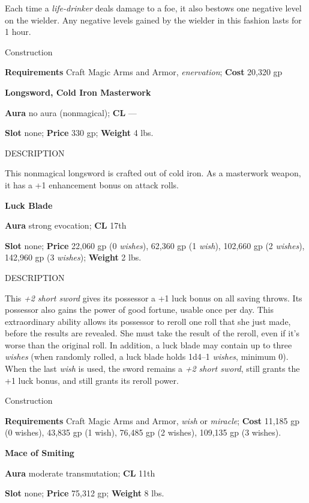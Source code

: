 Each time a \textit{life-drinker} deals damage to a foe, it also bestows one negative level on the wielder. Any negative levels gained by the wielder in this fashion lasts for 1 hour. 
				
Construction
				
\textbf{Requirements} Craft Magic Arms and Armor, \textit{enervation}; \textbf{Cost }20,320 gp
				
\textbf{Longsword, Cold Iron Masterwork }
				
\textbf{Aura} no aura (nonmagical); \textbf{CL} ---
				
\textbf{Slot} none; \textbf{Price} 330 gp; \textbf{Weight} 4 lbs.
				
DESCRIPTION
				
This nonmagical longsword is crafted out of cold iron. As a masterwork weapon, it has a +1 enhancement bonus on attack rolls. 
				
\textbf{Luck Blade}
				
\textbf{Aura} strong evocation; \textbf{CL} 17th
				
\textbf{Slot} none; \textbf{Price} 22,060 gp (0 \textit{wishes}), 62,360 gp (1 \textit{wish}), 102,660 gp (2 \textit{wishes}), 142,960 gp (3 \textit{wishes}); \textbf{Weight} 2 lbs.
				
DESCRIPTION
				
This \textit{+2 short sword} gives its possessor a +1 luck bonus on all saving throws. Its possessor also gains the power of good fortune, usable once per day. This extraordinary ability allows its possessor to reroll one roll that she just made, before the results are revealed. She must take the result of the reroll, even if it's worse than the original roll. In addition, a luck blade may contain up to three \textit{wishes} (when randomly rolled, a luck blade holds 1d4--1 \textit{wishes}, minimum 0). When the last \textit{wish} is used, the sword remains a \textit{+2 short sword}, still grants the +1 luck bonus, and still grants its reroll power. 
				
Construction
				
\textbf{Requirements} Craft Magic Arms and Armor, \textit{wish} or \textit{miracle}; \textbf{Cost }11,185 gp (0 wishes), 43,835 gp (1 wish), 76,485 gp (2 wishes), 109,135 gp (3 wishes).
				
\textbf{Mace of Smiting}
				
\textbf{Aura} moderate transmutation;\textbf{ CL }11th
				
\textbf{Slot} none; \textbf{Price} 75,312 gp; \textbf{Weight} 8 lbs.
				
